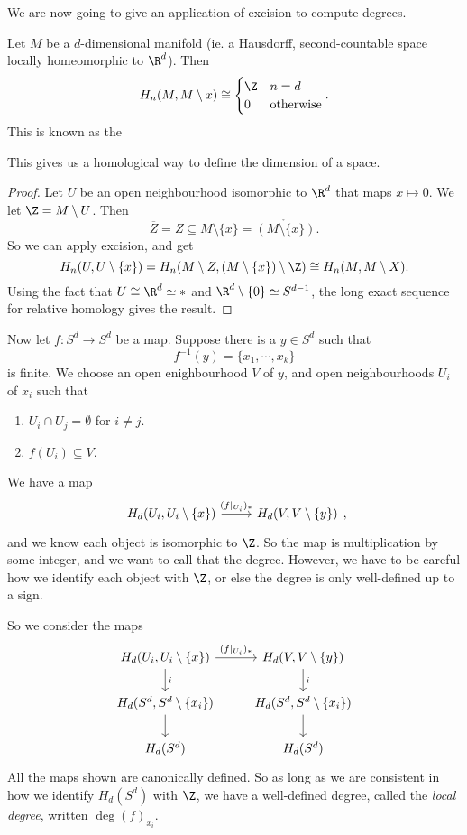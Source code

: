 \documentclass[a4paper]{article}
\begin{document}
We are now going to give an application of excision to compute degrees.

\begin{lemma}
  Let $M$ be a $d$-dimensional manifold (ie. a Hausdorff, second-countable space locally homeomorphic to $\R^d$). Then
  \[
    H_n(M, M \setminus x) \cong
    \begin{cases}
      \Z & n = d\\
      0 & \text{otherwise}
    \end{cases}.
  \]
  This is known as the 
\end{lemma}
This gives us a homological way to define the dimension of a space.

\begin{proof}
  Let $U$ be an open neighbourhood isomorphic to $\R^d$ that maps $x \mapsto 0$. We let $\Z = M\setminus U$. Then
  \[
    \overline{Z} = Z \subseteq M \setminus \{x\} = \mathring{(M \setminus \{x\})}.
  \]
  So we can apply excision, and get
  \[
    H_n(U, U \setminus \{x\}) = H_n(M\setminus Z, (M\setminus \{x\})\setminus \Z) \cong H_n(M, M\setminus X).
  \]
  Using the fact that $U \cong \R^d \simeq *$ and $\R^d \setminus \{0\} \simeq S^{d - 1}$, the long exact sequence for relative homology gives the result.
\end{proof}

Now let $f: S^d \to S^d$ be a map. Suppose there is a $y \in S^d$ such that
\[
  f^{-1}(y) = \{x_1, \cdots, x_k\}
\]
is finite. We choose an open enighbourhood $V$ of $y$, and open neighbourhoods $U_i$ of $x_i$ such that
\begin{enumerate}
  \item $U_i \cap U_j = \emptyset$ for $i \not= j$.
  \item $f(U_i) \subseteq V$.
\end{enumerate}
We have a map
\[
  \begin{tikzcd}
    H_d(U_i, U_i \setminus \{x\}) \ar[r, "(f|_{U_i})_*"] & H_d(V, V \setminus \{y\})
  \end{tikzcd},
\]
and we know each object is isomorphic to $\Z$. So the map is multiplication by some integer, and we want to call that the degree. However, we have to be careful how we identify each object with $\Z$, or else the degree is only well-defined up to a sign.

So we consider the maps
\[
  \begin{tikzcd}
    H_d(U_i, U_i \setminus \{x\}) \ar[r, "(f|_{U_i})_*"] \ar[d, "i"] & H_d(V, V \setminus \{y\}) \ar[d, "i"]\\
    H_d(S^d, S^d\setminus\{x_i\}) \ar[d] & H_d(S^d, S^d\setminus\{x_i\}) \ar[d]\\
    H_d(S^d) & H_d(S^d)
  \end{tikzcd}
\]
All the maps shown are canonically defined. So as long as we are consistent in how we identify $H_d(S^d)$ with $\Z$, we have a well-defined degree, called the \emph{local degree}, written $\deg(f)_{x_i}$.
\end{document}

